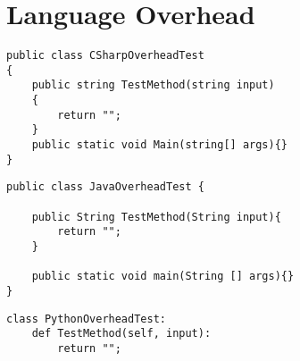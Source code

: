 \section{Language Overhead}


	\lstset{style=sharpc}
	\begin{lstlisting}
public class CSharpOverheadTest
{
	public string TestMethod(string input)
	{
		return "";
	}
	public static void Main(string[] args){}
}
	\end{lstlisting}


	\lstset{style=sharpc}
	\begin{lstlisting}
public class JavaOverheadTest {

	public String TestMethod(String input){
		return "";
	}

	public static void main(String [] args){}	
}
	\end{lstlisting}


	\lstset{style=sharpc}
	\begin{lstlisting}
class PythonOverheadTest:
	def TestMethod(self, input):
		return "";
	\end{lstlisting}

